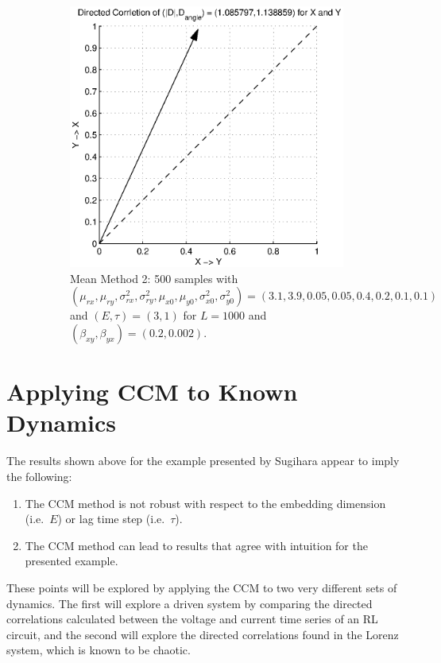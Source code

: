 \documentclass[a4paper,11pt]{article}
\begin{document}
\begin{figure}[h!t]
\begin{subfigure}[b]{0.4\textwidth}
\includegraphics[scale=0.55]{graphics/SugEx2DCORR_mean2.eps}
\caption{Mean Method 2: 500 samples with $\left(\mu_{rx},\mu_{ry},\sigma^2_{rx},\sigma^2_{ry},\mu_{x0},\mu_{y0},\sigma^2_{x0},\sigma^2_{y0}\right) = \left(3.1,3.9,0.05,0.05,0.4,0.2,0.1,0.1\right)$ and $\left(E,\tau\right)=\left(3,1\right)$ for $L=1000$ and $(\beta_{xy},\beta_{yx})=(0.2,0.002)$.}
\end{subfigure}
\caption{}
\end{figure}

\section{Applying CCM to Known Dynamics}
The results shown above for the example presented by Sugihara appear to imply the following:
\begin{enumerate}
\item The CCM method is not robust with respect to the embedding dimension (i.e.\ $E$) or lag time step (i.e.\ $\tau$).
\item The CCM method can lead to results that agree with intuition for the presented example. 
\end{enumerate}
These points will be explored by applying the CCM to two very different sets of dynamics.  The first will explore a driven system by comparing the directed correlations calculated between the voltage and current time series of an RL circuit, and the second will explore the directed correlations found in the Lorenz system, which is known to be chaotic.
\end{document}
